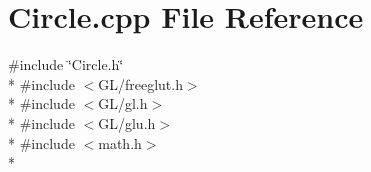 \section{Circle.\-cpp File Reference}
\label{_circle_8cpp}
{\ttfamily \#include \char`\"{}Circle.\-h\char`\"{}}\\*
{\ttfamily \#include $<$G\-L/freeglut.\-h$>$}\\*
{\ttfamily \#include $<$G\-L/gl.\-h$>$}\\*
{\ttfamily \#include $<$G\-L/glu.\-h$>$}\\*
{\ttfamily \#include $<$math.\-h$>$}\\*
